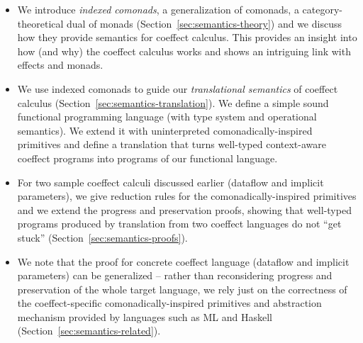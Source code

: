 \begin{itemize}
\item We introduce \emph{indexed comonads}, a generalization of comonads, a category-theoretical
  dual of monads (Section~\ref{sec:semantics-theory}) and we discuss how they provide semantics
  for coeffect calculus. This provides an insight into how (and why) the coeffect calculus works and
  shows an intriguing link with effects and monads.

\item We use indexed comonads to guide our \emph{translational semantics} of coeffect calculus
  (Section~\ref{sec:semantics-translation}). We define a simple sound functional programming
  language (with type system and operational semantics). We extend it with uninterpreted
  comonadically-inspired primitives and define a translation that turns well-typed context-aware
  coeffect programs into programs of our functional language.

\item For two sample coeffect calculi discussed earlier (dataflow and implicit parameters),
  we give reduction rules for the comonadically-inspired primitives and we extend the progress
  and preservation proofs, showing that well-typed programs produced by translation from two
  coeffect languages do not ``get stuck'' (Section~\ref{sec:semantics-proofs}).

\item We note that the proof for concrete coeffect language (dataflow and implicit parameters) can
  be generalized -- rather than reconsidering progress and preservation of the whole target
  language, we rely just on the correctness of the coeffect-specific comonadically-inspired
  primitives and abstraction mechanism provided by languages such as ML and Haskell
  (Section~\ref{sec:semantics-related}).
\end{itemize}


%
%

